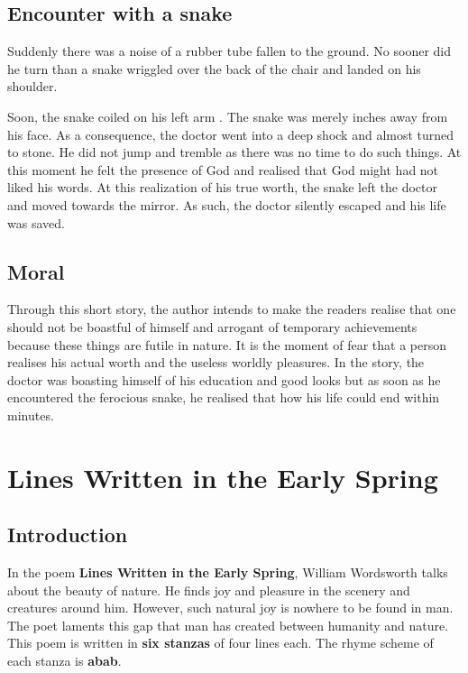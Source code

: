 \documentclass[a4paper,12pt]{book}
\begin{document}
\section{Encounter with a snake}
\label{sec:org943a7f2}

Suddenly there was a noise of a rubber tube fallen to the ground. No sooner did he turn than a snake wriggled over the back of the chair and landed on his shoulder.

Soon, the snake coiled on his left arm . The snake was merely inches away from his face. As a consequence, the doctor went into a deep shock and almost turned to stone. He did not jump and tremble as there was no time to do such things. At this moment he felt the presence of God and realised that God might had not liked his words. At this realization of his true worth, the snake left the doctor and moved towards the mirror. As such, the doctor silently escaped and his life was saved.

\section{Moral}
\label{sec:org717f2da}

Through this short story, the author intends to make the readers realise that one should not be boastful of himself and arrogant of temporary achievements because these things are futile in nature. It is the moment of fear that a person realises his actual worth and the useless worldly pleasures. In the story, the doctor was boasting himself of his education and good looks but as soon as he encountered the ferocious snake, he realised that how his life could end within minutes.

\chapter{Lines Written in the Early Spring}
\label{sec:orgfe407f8}

\section{Introduction}
\label{sec:orgde64233}

In the poem \textbf{Lines Written in the Early Spring}, William Wordsworth talks about the beauty of nature. He finds joy and pleasure in the scenery and creatures around him. However, such natural joy is nowhere to be found in man. The poet laments this gap that man has created between humanity and nature. This poem is written in \textbf{six stanzas} of four lines each. The rhyme scheme of each stanza is \textbf{abab}.
\end{document}
